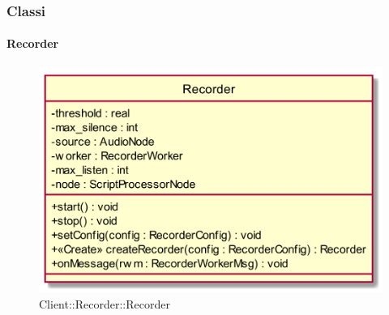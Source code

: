 \subsubsection{Classi}
\hypertarget{Recorder_label}{\paragraph{Recorder}}
\begin{figure}[h]
	\centering
	\includegraphics[width=\textwidth,height=\textheight,keepaspectratio]{images/ClassRecorder.png}
	\caption{Client::Recorder::Recorder}
\end{figure}
